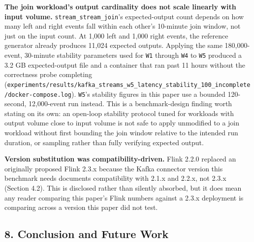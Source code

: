 \documentclass[
]{article}
\begin{document}
\textbf{The join workload's output cardinality does not scale linearly
with input volume.} \texttt{stream\_stream\_join}'s expected-output
count depends on how many left and right events fall within each other's
10-minute join window, not just on the input count. At 1,000 left and
1,000 right events, the reference generator already produces 11,024
expected outputs. Applying the same 180,000-event, 30-minute stability
parameters used for \texttt{W1} through \texttt{W4} to \texttt{W5}
produced a 3.2 GB expected-output file and a container that ran past 11
hours without the correctness probe completing
(\texttt{experiments/results/kafka\_streams\_w5\_latency\_stability\_100\_incomplete/docker-compose.log}).
\texttt{W5}'s stability figures in this paper use a bounded 120-second,
12,000-event run instead. This is a benchmark-design finding worth
stating on its own: an open-loop stability protocol tuned for workloads
with output volume close to input volume is not safe to apply unmodified
to a join workload without first bounding the join window relative to
the intended run duration, or sampling rather than fully verifying
expected output.

\textbf{Version substitution was compatibility-driven.} Flink 2.2.0
replaced an originally proposed Flink 2.3.x because the Kafka connector
version this benchmark needs documents compatibility with 2.1.x and
2.2.x, not 2.3.x (Section 4.2). This is disclosed rather than silently
absorbed, but it does mean any reader comparing this paper's Flink
numbers against a 2.3.x deployment is comparing across a version this
paper did not test.

\hypertarget{conclusion-and-future-work}{%
\subsection{8. Conclusion and Future
Work}\label{conclusion-and-future-work}}
\end{document}
